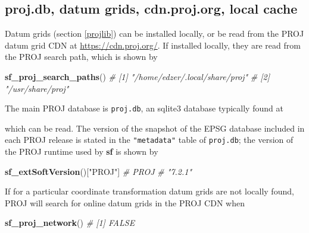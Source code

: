 \documentclass[]{book}
\newenvironment{Shaded}{\begin{snugshade}}{\end{snugshade}}
\newcommand{\CommentTok}[1]{\textcolor[rgb]{0.56,0.35,0.01}{\textit{#1}}}
\newcommand{\DecValTok}[1]{\textcolor[rgb]{0.00,0.00,0.81}{#1}}
\newcommand{\KeywordTok}[1]{\textcolor[rgb]{0.13,0.29,0.53}{\textbf{#1}}}
\newcommand{\NormalTok}[1]{#1}
\newcommand{\OperatorTok}[1]{\textcolor[rgb]{0.81,0.36,0.00}{\textbf{#1}}}
\newcommand{\StringTok}[1]{\textcolor[rgb]{0.31,0.60,0.02}{#1}}
\begin{document}
\hypertarget{proj.db-datum-grids-cdn.proj.org-local-cache}{%
\subsection{proj.db, datum grids, cdn.proj.org, local cache}\label{proj.db-datum-grids-cdn.proj.org-local-cache}}

Datum grids (section \ref{projlib}) can be installed locally, or
be read from the PROJ datum grid CDN at \url{https://cdn.proj.org/}. If
installed locally, they are read from the PROJ search path, which
is shown by

\begin{Shaded}
\begin{Highlighting}[]
\KeywordTok{sf_proj_search_paths}\NormalTok{()}
\CommentTok{# [1] "/home/edzer/.local/share/proj"}
\CommentTok{# [2] "/usr/share/proj"}
\end{Highlighting}
\end{Shaded}

The main PROJ database is \texttt{proj.db}, an sqlite3 database typically
found at

\begin{Shaded}
\end{Shaded}

which can be read. The version of the snapshot of the EPSG database
included in each PROJ release is stated in the \texttt{"metadata"} table of
\texttt{proj.db}; the version of the PROJ runtime used by \textbf{sf} is shown by

\begin{Shaded}
\begin{Highlighting}[]
\KeywordTok{sf_extSoftVersion}\NormalTok{()[}\StringTok{"PROJ"}\NormalTok{]}
\CommentTok{#    PROJ }
\CommentTok{# "7.2.1"}
\end{Highlighting}
\end{Shaded}

If for a particular coordinate transformation datum grids are not
locally found, PROJ will search for online datum grids in the PROJ
CDN when

\begin{Shaded}
\begin{Highlighting}[]
\KeywordTok{sf_proj_network}\NormalTok{()}
\CommentTok{# [1] FALSE}
\end{Highlighting}
\end{Shaded}
\end{document}
